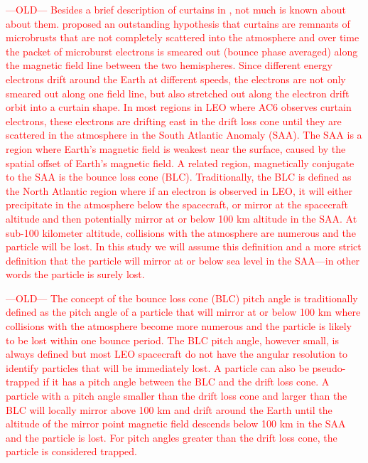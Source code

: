 \documentclass[draft]{agujournal2019}
\begin{document}
\textcolor{red}{---OLD--- Besides a brief description of curtains in , not much is known about about them.  proposed an outstanding hypothesis that curtains are remnants of microbrusts that are not completely scattered into the atmosphere and over time the packet of microburst electrons is smeared out (bounce phase averaged) along the magnetic field line between the two hemispheres. Since different energy electrons drift around the Earth at different speeds, the electrons are not only smeared out along one field line, but also stretched out along the electron drift orbit into a curtain shape. In most regions in LEO where AC6 observes curtain electrons, these electrons are drifting east in the drift loss cone until they are scattered in the atmosphere in the South Atlantic Anomaly (SAA). The SAA is a region where Earth's magnetic field is weakest near the surface, caused by the spatial offset of Earth's magnetic field. A related region, magnetically conjugate to the SAA is the bounce loss cone (BLC). Traditionally, the BLC is defined as the North Atlantic region where if an electron is observed in LEO, it will either precipitate in the atmosphere below the spacecraft, or mirror at the spacecraft altitude and then potentially mirror at or below 100 km altitude in the SAA. At sub-100 kilometer altitude, collisions with the atmosphere are numerous and the particle will be lost. In this study we will assume this definition and a more strict definition that the particle will mirror at or below sea level in the SAA---in other words the particle is surely lost.}

\textcolor{red}{---OLD--- The concept of the bounce loss cone (BLC) pitch angle is traditionally defined as the pitch angle of a particle that will mirror at or below 100 km where collisions with the atmosphere become more numerous and the particle is likely to be lost within one bounce period. The BLC pitch angle, however small, is always defined but most LEO spacecraft do not have the angular resolution to identify particles that will be immediately lost. A particle can also be pseudo-trapped if it has a pitch angle between the BLC and the drift loss cone. A particle with a pitch angle smaller than the drift loss cone and larger than the BLC will locally mirror above 100 km and drift around the Earth until the altitude of the mirror point magnetic field descends below 100 km in the SAA and the particle is lost. For pitch angles greater than the drift loss cone, the particle is considered trapped.}
\end{document}
